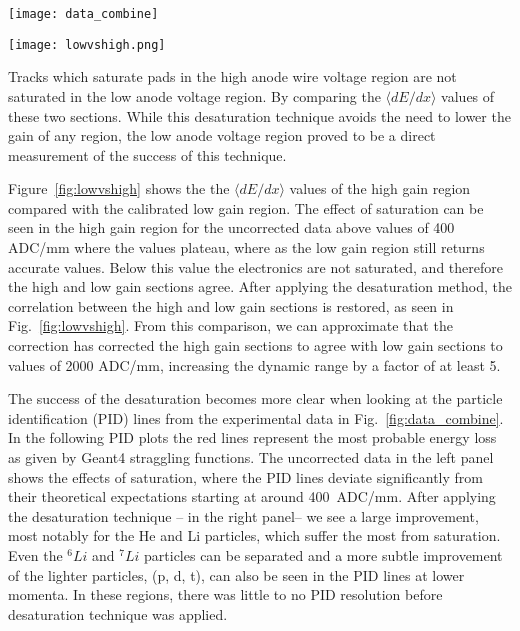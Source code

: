 \begin{figure*}[!htb]
\centering
\texttt{[image: data\_combine]}
\caption{Uncorrected (left panel) and desaturated (right panel) collision data at polar angles of $\theta < 40^{\circ}$ and azimuthal angles between $-80^{\circ} < \phi < 80^{\circ}$}
\label{fig:data_combine}
\end{figure*}


\begin{figure*}[!htb]
\centering
\texttt{[image: lowvshigh.png]}
\caption{Uncorrected (left panel) and desaturated (right panel) collision data comparing the low gain region to the high gain anode regions of the TPC.}
\label{fig:lowvshigh}
\end{figure*}

Tracks which saturate pads in the high anode wire voltage region are not saturated in the low anode voltage region. By comparing the $\langle dE/dx\rangle$ values of these two sections. While this desaturation technique avoids the need to lower the gain of any region, the low anode voltage region proved to be a direct measurement of the success of this technique.
 
Figure~\ref{fig:lowvshigh} shows the the $\langle dE/dx\rangle$ values of the high gain region compared with the calibrated low gain region. The effect of saturation can be seen in the high gain region for the uncorrected data above values of 400 ADC/mm where the values plateau, where as the low gain region still returns accurate values. Below this value the electronics are not saturated, and therefore the high and low gain sections agree. After applying the desaturation method, the correlation between the high and low gain sections is restored, as seen in Fig.~\ref{fig:lowvshigh}. From this comparison, we can approximate that the correction has corrected the high gain sections to agree with low gain sections to values of 2000 ADC/mm, increasing the dynamic range by a factor of at least 5.

The success of the desaturation becomes more clear when looking at the particle identification (PID) lines from the experimental data in Fig.~\ref{fig:data_combine}. In the following PID plots the red lines represent the most probable energy loss as given by Geant4 straggling functions. The uncorrected data in the left panel shows the effects of saturation, where the PID lines deviate significantly from their theoretical expectations starting at around 400~ADC/mm. After applying the desaturation technique -- in the right panel-- we see a large improvement, most notably for the He and Li particles, which suffer the most from saturation. Even the ${}^{6}Li$ and ${}^{7}Li$ particles can be separated and a more subtle improvement of the lighter particles, (p, d, t), can also be seen in the PID lines at lower momenta. In these regions, there was little to no PID resolution before desaturation technique was applied.  



